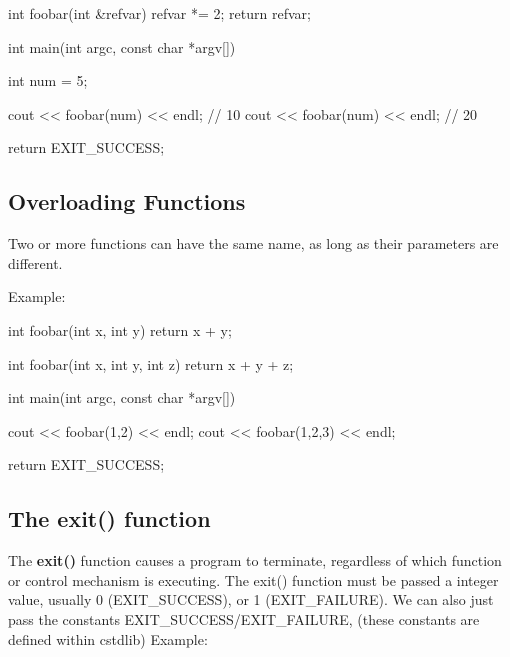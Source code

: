 \documentclass{report}
\begin{document}
    \begin{cppcode}
int foobar(int &refvar) { refvar *= 2; return refvar; }

int main(int argc, const char *argv[]) {
    
    int num = 5;

    cout << foobar(num) << endl;  // 10
    cout << foobar(num) << endl;  // 20

    return EXIT_SUCCESS;
}
    \end{cppcode}
    
    
    \bigbreak \noindent 
    \bigbreak \noindent 

    \pagebreak
    \subsection{Overloading Functions}
    \bigbreak \noindent 
    \begin{concept}
 Two or more functions can have the same name, as long as their parameters are different.
	\end{concept}
    \bigbreak \noindent 
    Example:
    \bigbreak \noindent 
    
    \begin{cppcode}
int foobar(int x, int y) { return x + y; }

int foobar(int x, int y, int z) { return x + y + z; }

int main(int argc, const char *argv[]) {

    cout << foobar(1,2) << endl;
    cout << foobar(1,2,3) << endl;

    return EXIT_SUCCESS;
}
    \end{cppcode}
    

    \bigbreak \noindent \bigbreak \noindent 
    \subsection{The exit() function}
    \bigbreak \noindent 
    \begin{concept}

	\end{concept}
    \bigbreak \noindent 
    The \textbf{exit()} function causes a program to terminate, regardless of which function or control mechanism is executing.
    \bigbreak \noindent 
    \bigbreak \noindent 
    The exit() function must be passed a integer value, usually 0 (EXIT\_SUCCESS), or 1 (EXIT\_FAILURE). We can also just pass the constants EXIT\_SUCCESS/EXIT\_FAILURE, (these constants are defined within cstdlib)
    Example:
    \bigbreak \noindent 
    
\end{document}

